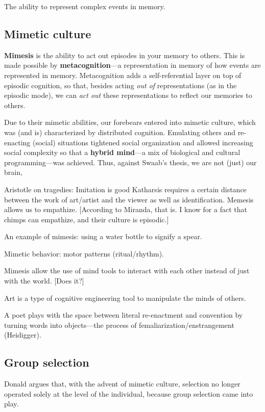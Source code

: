 \documentclass{article}
\begin{document}
The ability to represent complex events in memory.

\subsection{Mimetic culture}

\textbf{Mimesis} is the ability to act out episodes in your memory to others. 
This is made possible by \textbf{metacognition}---a representation in memory of
how events are represented in memory. Metacognition adds a self-referential
layer on top of episodic cognition, so that, besides acting \emph{out of}
representations (as in the episodic mode), we can \emph{act out} these
representations to reflect our memories to others.

Due to their mimetic abilities, our forebears entered into mimetic culture,
which was (and is) characterized by distributed cognition. Emulating others
and re-enacting (social) situations tightened social organization and allowed
increasing social complexity so that a \textbf{hybrid mind}---a mix of
biological and cultural programming---was achieved. Thus, against Swaab's thesis,
we are not (just) our brain, 

Aristotle on tragedies: Imitation is good
Katharsis requires a certain distance between the work of art/artist and the viewer as well as identification. Memesis allows us to empathize. [According to Miranda, that is. I know for a fact that chimps can empathize, and their culture is episodic.]

An example of mimesis: using a water bottle to signify a spear.

Mimetic behavior: motor patterns (ritual/rhythm).

Mimesis allow the use of mind tools to interact with each other instead of just with the world. [Does it?]

Art is a type of cognitive engineering tool to manipulate the minds of others.

A poet plays with the space between literal re-enactment and convention by turning words into objects---the process of femaliarization/enstrangement (Heidigger).

\subsection{Group selection}

Donald argues that, with the advent of mimetic culture, selection no longer operated solely at the level of the individual, because group selection came into play.
\end{document}
